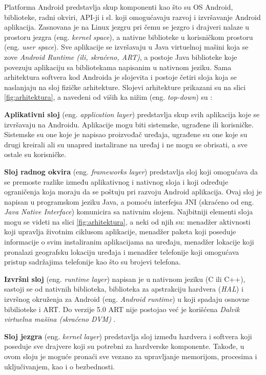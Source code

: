 \documentclass[android.tex]{subfiles}
\begin{document}
Platforma Android predstavlja skup komponenti kao što su OS Android, biblioteke, radni okviri, API-ji i sl. koji omogućavaju razvoj i izvršavanje Android aplikacija. Zasnovana je na Linux jezgru pri čemu se jezgro i drajveri nalaze u prostoru jezgra (eng. \textit{kernel space}), a nativne biblioteke u korisničkom prostoru (eng. \textit{user space}). Sve aplikacije se izvršavaju u Java virtuelnoj mašini koja se zove \textit{Android Runtime (ili, skraćeno, ART)}, a postoje Java biblioteke koje povezuju aplikaciju sa bibliotekama napisanim u nativnom jeziku. Sama arhitektura softvera kod Androida je slojevita i postoje četiri sloja koja se naslanjaju na sloj fizičke arhitekture. Slojevi arhitekture prikazani su na slici \ref{fig:arhitektura}, a navedeni od viših ka nižim (eng. \textit{top-down}) su \cite{book:papp}:
\begin{description}
\item \textbf{Aplikativni sloj} (eng. \textit{application layer}) predstavlja skup svih aplikacija koje se izvršavaju na Androidu. Aplikacije mogu biti sistemske, ugrađene ili korisničke. Sistemske su one koje je napisao proizvođač uređaja, ugrađene su one koje su drugi kreirali ali su unapred instalirane na uređaj i ne mogu se obrisati, a sve ostale su korisničke.
\item \textbf{Sloj radnog okvira} (eng. \textit{frameworks layer}) predstavlja sloj koji omogućava da se premoste razlike između aplikativnog i nativnog sloja i koji određuje ograničenja koja moraju da se poštuju pri razvoju Android aplikacija. Ovaj sloj je napisan u programskom jeziku Java, a pomoću interfejsa JNI (skraćeno od eng. \textit{Java Native Interface}) komunicira sa nativnim slojem. Najbitniji elementi sloja mogu se videti na slici \ref{fig:arhitektura}, a neki od njih su: menadžer aktivnosti koji upravlja životnim ciklusom aplikacije, menadžer paketa koji poseduje informacije o svim instaliranim aplikacijama na uređaju, menadžer lokacije koji pronalazi geografsku lokaciju uređaja i menadžer telefonije koji omogućava pristup sadržajima telefonije kao što su brojevi telefona. 
\item \textbf{Izvršni sloj} (eng. \textit{runtime layer}) napisan je u nativnom jeziku (C ili C++), sastoji se od nativnih biblioteka, biblioteka za apstrakciju hardvera (\textit{HAL}) i izvršnog okruženja za Android (eng. \textit{Android runtime}) u koji spadaju osnovne bibilioteke i ART. Do verzije 5.0 ART nije postojao već je korišćena \textit{Dalvik virtuelna mašina (skraćeno DVM)} \cite{sajt:dalvik}. 
\item \textbf{Sloj jezgra} (eng. \textit{kernel layer}) predstavlja sloj između hardvera i softvera koji poseduje sve drajvere koji su potrebni za hardverske komponente. Takođe, u ovom sloju je moguće pronaći sve vezano za upravljanje memorijom, procesima i uključivanjem, kao i o bezbednosti. 
\end{description}
\end{document}
